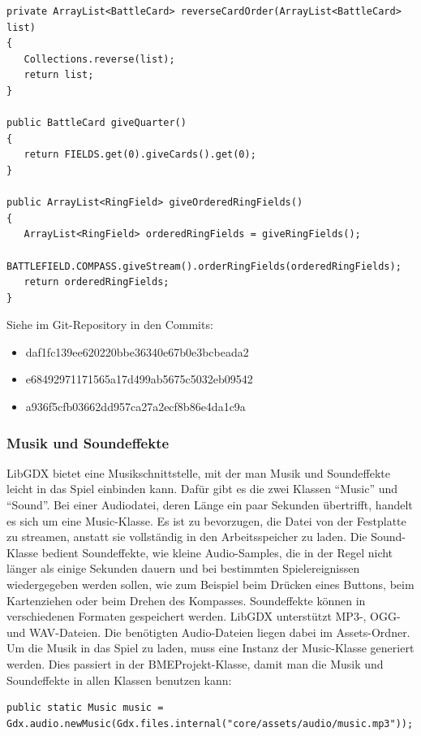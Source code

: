 \begin{lstlisting}
private ArrayList<BattleCard> reverseCardOrder(ArrayList<BattleCard> list)
{
   Collections.reverse(list);
   return list;
}

public BattleCard giveQuarter()
{
   return FIELDS.get(0).giveCards().get(0);
}

public ArrayList<RingField> giveOrderedRingFields()
{
   ArrayList<RingField> orderedRingFields = giveRingFields();
   BATTLEFIELD.COMPASS.giveStream().orderRingFields(orderedRingFields);
   return orderedRingFields;
}
\end{lstlisting}

Siehe im Git-Repository in den Commits:
\begin{itemize}
\item daf1fc139ee620220bbe36340e67b0e3bcbeada2
\item e68492971171565a17d499ab5675c5032eb09542
\item a936f5cfb03662dd957ca27a2ecf8b86e4da1c9a
\end{itemize}

\subsubsection{Musik und Soundeffekte}
LibGDX bietet eine Musikschnittstelle, mit der man Musik und Soundeffekte leicht in das Spiel einbinden kann. Dafür gibt es die zwei Klassen “Music” und “Sound”. Bei einer Audiodatei, deren Länge ein paar Sekunden übertrifft, handelt es sich um eine Music-Klasse.  Es ist zu bevorzugen, die Datei von der Festplatte zu streamen, anstatt sie vollständig in den Arbeitsspeicher zu laden. Die Sound-Klasse bedient Soundeffekte, wie kleine Audio-Samples, die in der Regel nicht länger als einige Sekunden dauern und bei bestimmten Spielereignissen wiedergegeben werden sollen, wie zum Beispiel beim Drücken eines Buttons, beim Kartenziehen oder beim Drehen des Kompasses. Soundeffekte können in verschiedenen Formaten gespeichert werden. LibGDX unterstützt MP3-, OGG- und WAV-Dateien. Die benötigten Audio-Dateien liegen dabei im Assets-Ordner.
Um die Musik in das Spiel zu laden, muss eine Instanz der Music-Klasse generiert werden. Dies passiert in der BMEProjekt-Klasse, damit man die Musik und Soundeffekte in allen Klassen benutzen kann:

\begin{lstlisting}
public static Music music = Gdx.audio.newMusic(Gdx.files.internal("core/assets/audio/music.mp3"));
\end{lstlisting}

